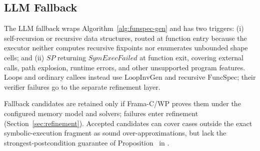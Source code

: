 \subsection{LLM Fallback}
\label{sec:llm-fallback}

The LLM fallback wraps Algorithm~\ref{alg:funspec-gen} and has two triggers: (i) self-recursion or recursive data structures, routed at function entry because the executor neither computes recursive fixpoints nor enumerates unbounded shape cells; and (ii) $\textit{SP}$ returning $\textit{SymExecFailed}$ at function exit, covering external calls, path explosion, runtime errors, and other unsupported program features. Loops and ordinary callees instead use $\mathrm{LoopInvGen}$ and recursive $\mathrm{FuncSpec}$; their verifier failures go to the separate refinement layer.


Fallback candidates are retained only if Frama-C/WP proves them under the configured memory model and solvers; failures enter refinement (Section~\ref{sec:refinement}). Accepted candidates can cover cases outside the exact symbolic-execution fragment as sound over-approximations, but lack the strongest-postcondition guarantee of Proposition~ in .

